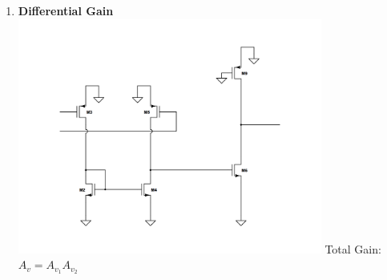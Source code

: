 \documentclass[]{article}
\begin{document}
\begin{enumerate}
		{With pure common mode input, we have the following: }

		$$ V_{DS_{4}} = V_{DS_{2}} = V_{t_{2}}+V_{ov_{2}} $$
		$$ V_{GD_{3}} = V_{GD_{5}} = V_{IC} - V_{t_{2}} -V_{ov_{2}} $$
		When $V_{IC}$ is reduced to the point where $ V_{GD_{3}} = V_{GD_{5}}  = V_{t_{3}} = V_{t_{5}}, M3 $ and $ M5 $ operate at the edge of saturation. 
		Thus, we define the lower end
		of the common mode input range to be :

		$$ V_{IC} \ge V_{t_{3}} + V_{t_{2}}+V_{ov_{2}}  $$
		$$ V_{IC} \ge V_{ov_{2}}  $$

		The specification calls for a common mode input range that is $ 0.8V $ inside the output swing range. This gives us a constraint on $  V_{ov_{2}} $

		$$ V_{IC_{min}} = 0.15 V $$
		$$ V_{ov_{2}}  \le 0.15V$$

		If $ V_{IC} $ is too high, we have $M7$ falling into the triode region. Consider the drain voltage of $ M7: $

		$$ V_{DS_{7}} = V_{IC} - V_{GS_{3}} -V_{DD} = V_{IC} - V_{t3} - V_{ov_{3}} - V_{DD} $$

		Therefore, $ V_{IC} $ must satisfy the following:

		$$ V_{IC} < V_{DD_{}}  -	| V_{t_{3}}| - |V_{ov_{3}}| - |V_{ov_{7}}| $$
		$$ V_{IC} < 1.5  -0.3 - |V_{ov_{3}}| - 0.15 $$
		$$ V_{IC} < 1.05 - |V_{ov_{3}}|  $$
		From the specification,
		$$V_{IC_{max}} = 0.95 V$$
		$$ 0.95 < 1.05 - |V_{ov_{3}}|  $$
		$$ |V_{ov_{3}}| < 0.100 $$

		\pagebreak

	\item %

		{\bf Differential Gain}
		\newline
		\includegraphics[width=100mm]{cmos-ss-model.png}
		\newline
		\newline
		Total Gain: $A_{v} = A_{v_{1}}A_{v_{2}}$


\end{enumerate}
\end{document}
